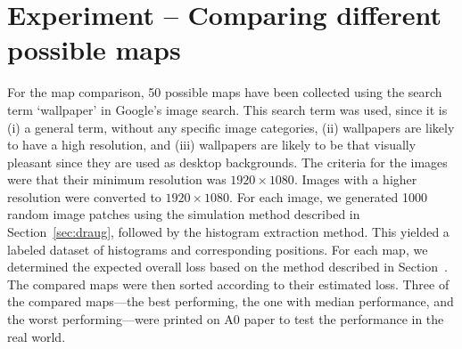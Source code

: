 \section{Experiment -- Comparing different possible maps}

For the map comparison, 50 possible maps have been collected using the
search term `wallpaper' in Google's image search. This search term was
used, since it is (i) a general term, without any specific image
categories, (ii) wallpapers are likely to have a high resolution, and
(iii) wallpapers are likely to be that visually pleasant since they
are used as desktop backgrounds. The criteria for the images were that
their minimum resolution was $1920 \times 1080$. Images with a higher
resolution were converted to $1920 \times 1080$.  For each image, we
generated 1000 random image patches using the simulation method
described in Section~\ref{sec:draug}, followed by the histogram
extraction method. This yielded a labeled dataset of histograms and
corresponding positions. For each map, we determined the expected
overall loss based on the method described in
Section~\label{sec:mapeval}. The compared maps were then sorted
according to their estimated loss. Three of the compared maps---the
best performing, the one with median performance, and the worst
performing---were printed on A0 paper to test the performance in the
real world.

